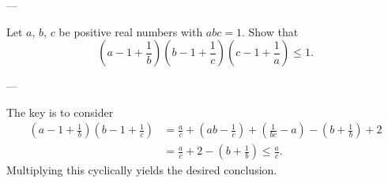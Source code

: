 
---

Let $a$, $b$, $c$ be positive real numbers with $abc=1$. Show that \[\left(a-1+\frac1b\right)\left(b-1+\frac1c\right)\left(c-1+\frac1a\right)\le1.\]

---

The key is to consider
\begin{align*}
    \left(a-1+\frac1b\right)\left(b-1+\frac1c\right)&=\frac ac+\left(ab-\frac1c\right)+\left(\frac1{bc}-a\right)-\left(b+\frac1b\right)+2\\
    &=\frac ac+2-\left(b+\frac1b\right)\le\frac ac.
\end{align*}
Multiplying this cyclically yields the desired conclusion.
